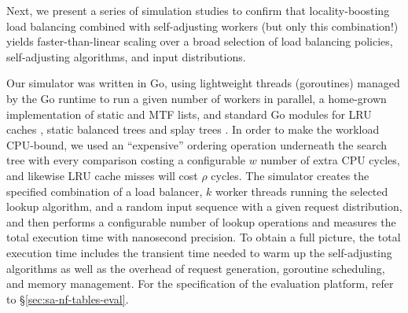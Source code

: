 Next, we present a series of simulation studies to confirm that locality-boosting load balancing combined with self-adjusting workers (but only this combination!) yields faster-than-linear scaling over a broad selection of load balancing policies, self-adjusting algorithms, and input distributions.

Our simulator was written in Go, using lightweight threads (goroutines) managed by the Go runtime to run a given number of workers in parallel, a home-grown implementation of static and MTF lists, and standard Go modules for LRU caches \cite{golang-lru}, static balanced trees \cite{golang-btree} and splay trees \cite{golang-splay}. In order to make the workload CPU-bound, we used an ``expensive'' ordering operation underneath the search tree with every comparison costing a configurable $w$ number of extra CPU cycles, and likewise LRU cache misses will cost $\rho$ cycles. The simulator creates the specified combination of a load balancer, $k$ worker threads running the selected lookup algorithm, and a random input sequence with a given request distribution, and then performs a configurable number of lookup operations and measures the total execution time with nanosecond precision. To obtain a full picture, the total execution time includes the transient time needed to warm up the self-adjusting algorithms as well as the overhead of request generation, goroutine scheduling, and memory management. For the specification of the evaluation platform, refer to \S\ref{sec:sa-nf-tables-eval}.

